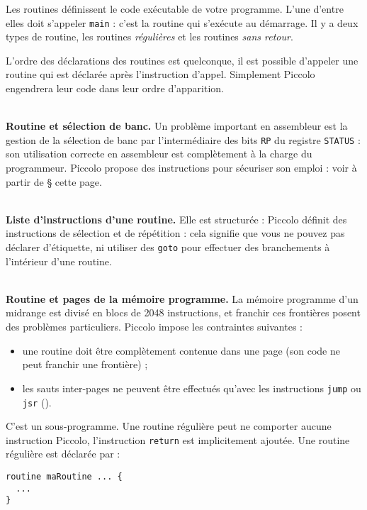 
Les routines définissent le code exécutable de votre programme. L’une d’entre elles doit s’appeler \texttt{main} : c’est la routine qui s’exécute au démarrage. Il y a deux types de routine, les routines \emph{régulières} et les routines \emph{sans retour}.


L’ordre des déclarations des routines est quelconque, il est possible d’appeler une routine qui est déclarée après l’instruction d’appel. Simplement Piccolo engendrera leur code dans leur ordre d’apparition. 

~\\
\textbf{Routine et sélection de banc.} Un problème important en assembleur est la gestion de la sélection de banc par l’intermédiaire des bits \texttt{RP} du registre \texttt{STATUS} : son utilisation correcte en assembleur est complètement à la charge du programmeur. Piccolo propose des instructions pour sécuriser son emploi : voir à partir de § cette page.

~\\
\textbf{Liste d’instructions d’une routine.} Elle est structurée : Piccolo définit des instructions de sélection et de répétition : cela signifie que vous ne pouvez pas déclarer d’étiquette, ni utiliser des \texttt{goto} pour effectuer des branchements à l’intérieur d’une routine.

~\\
\textbf{Routine et pages de la mémoire programme.} La mémoire programme d’un midrange est divisé en blocs de 2048 instructions, et franchir ces frontières posent des problèmes particuliers. Piccolo impose les contraintes suivantes :\begin{itemize}
  \item une routine doit être complètement contenue dans une page (son code ne peut franchir une frontière) ;
  \item les sauts inter-pages ne peuvent être effectués qu’avec les instructions \texttt{jump} ou \texttt{jsr} ().
\end{itemize}


C'est un sous-programme. Une routine régulière peut ne comporter aucune instruction Piccolo, l'instruction \texttt{return} est implicitement ajoutée. Une routine régulière est déclarée par :
\begin{lstlisting}[language=piccolo]
routine maRoutine ... {
  ...
}
\end{lstlisting}

